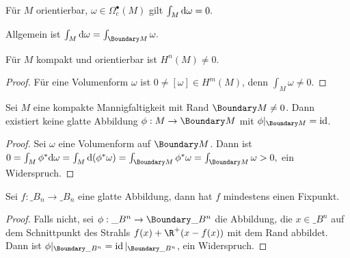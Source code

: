 \begin{st} \label{7.10}
    Für $M$ orientierbar, $\omega \in \Omega_c^\bullet(M)$ gilt
    \begin{math}
        \int_M \mathrm{d} \omega = 0.
    \end{math}
    \begin{note}
        Allgemein ist
        \begin{math}
            \int_M \d \omega = \int_{\Boundary M} \omega.
        \end{math}
    \end{note}
\end{st}

\begin{kor} \label{7.11}
    Für $M$ kompakt und orientierbar ist $H^n(M) \neq 0$.
    \begin{proof}
        Für eine Volumenform $\omega$ ist $0 \neq [\omega] \in H^m(M)$, denn $\int_ M \omega \neq 0$.
    \end{proof}
\end{kor}

\begin{kor} \label{7.12}
    Sei $M$ eine kompakte Mannigfaltigkeit mit Rand $\Boundary M \neq 0$.
    Dann existiert keine glatte Abbildung $\phi: M \to \Boundary M$ mit $\phi|_{\Boundary M} = \id$.
    \begin{proof}
        Sei $\omega$ eine Volumenform auf $\Boundary M$.
        Dann ist
        \begin{math}
            0 = \int_M \phi^* \d \omega
            = \int_M \d(\phi^* \omega)
            = \int_{\Boundary M} \phi^* \omega
            = \int_{\Boundary M} \omega
            > 0,
        \end{math}
        ein Widerspruch.
    \end{proof}
\end{kor}

\begin{st} \label{7.13}
    Sei $f: \_{B_n} \to \_{B_n}$ eine glatte Abbildung, dann hat $f$ mindestens einen Fixpunkt.
    \begin{proof}
        Falls nicht, sei $\phi: \_{B^n} \to \Boundary \_{B^n}$ die Abbildung, die $x \in \_{B^n}$ auf dem Schnittpunkt des Strahls $f(x) + \R^+ (x - f(x))$ mit dem Rand abbildet.
        Dann ist $\phi|_{\Boundary \_{B^n}} = \id|_{\Boundary \_{B^n}}$, ein Widerspruch.
    \end{proof}
\end{st}

